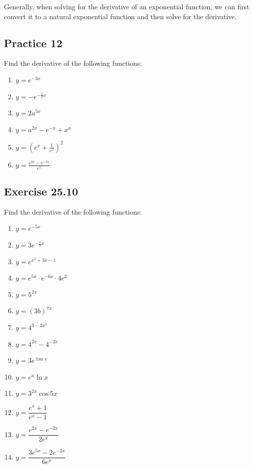 \documentclass[12pt]{report}
\begin{document}
Generally, when solving for the derivative of an exponential function, we can
first convert it to a natural exponential function and then solve for the
derivative.

\subsection{Practice 12}

Find the derivative of the following functions: \setlength{\columnseprule}{1pt}
\setlength{\columnsep}{24pt}
\begin{multicols}{2}
  \begin{enumerate}
    \item $y=e^{-3x}$
    \item $y=-e^{-{\frac{1}{3}x}}$
    \item $y=2a^{5x}$
    \item $y=a^{2x}-e^{-x}+x^{a}$
    \item $y={\left(e^{x}+{\frac{1}{e^{x}}}\right)}^{2}$
    \item $y={\frac{e^{3x}-e^{-3x}}{e^{x}}}$
  \end{enumerate}
\end{multicols}

\subsection{Exercise 25.10}

Find the derivative of the following functions: \setlength{\columnseprule}{1pt}
\setlength{\columnsep}{24pt}
\begin{multicols}{2}
  \begin{enumerate}
    \item $y=e^{-5x}$
    \item $y=3e^{-{\frac{1}{3}}x}$
    \item $y=e^{x^{2}+3x-1}$
    \item $y=e^{5x}\cdot e^{-6x}\cdot4e^{2}$
    \item $y=5^{2x}$
    \item $y={(3b)}^{7x}$
    \item $y=4^{3-2x^2}$
    \item $y=4^{2x}-4^{-2x}$
    \item $y=3e^{\tan x}$
    \item $y=e^{x}\ln x$
    \item $y=3^{2x}\cos5x$
    \item $y={\dfrac{e^{x}+1}{e^{x}-1}}$
    \item $y={\dfrac{e^{2x}-e^{-2x}}{2e^{x}}}$
    \item $y={\dfrac{3e^{5x}-2e^{-2x}}{6e^{x}}}$
  \end{enumerate}
\end{multicols}
\end{document}
